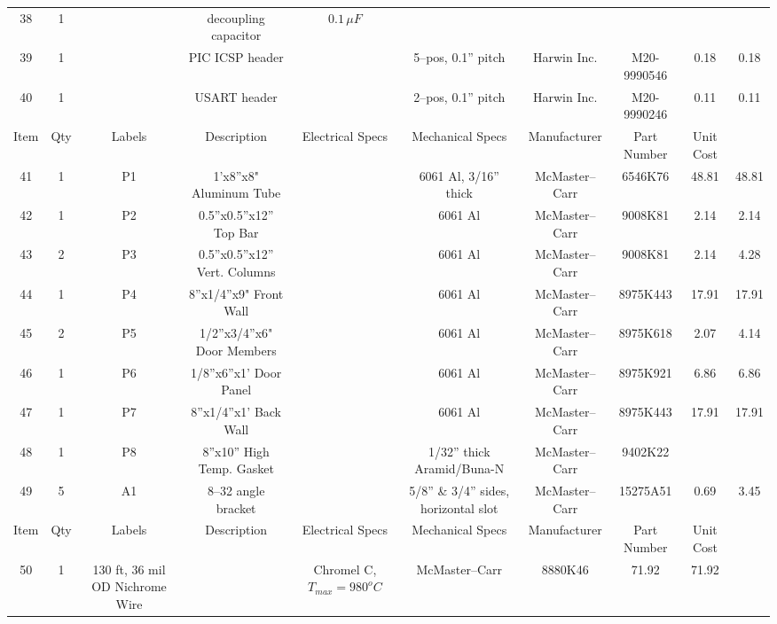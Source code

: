 \documentclass[10pt, twocolumn]{article}
\begin{document}
\begin{center}
\begin{adjustbox}{max width=\textwidth}
\begin{tabular}{c c c c c c c c c c}
38	&1	&	&decoupling capacitor		&$0.1\,\mu F$				&
	&		&				&		&	\\

39	&1	&	&PIC ICSP header		&				&5--pos, 0.1” pitch
	&Harwin Inc.	&M20-9990546			&0.18		&0.18	\\

40	&1	&	&USART header			&				&2--pos, 0.1” pitch
	&Harwin Inc.	&M20-9990246			&0.11		&0.11	\\

\hline
Item	&Qty	&Labels	&Description	&Electrical Specs	&Mechanical Specs
	&Manufacturer		&Part Number		&Unit Cost	&	\\
\hline

41	&1	&P1	&1'x8”x8" Aluminum Tube		&	&6061 Al, 3/16” thick
	&McMaster--Carr	&6546K76			&48.81		&48.81	\\

42	&1	&P2	&0.5”x0.5”x12” Top Bar		&	&6061 Al
	&McMaster--Carr	&9008K81			&2.14		&2.14	\\

43	&2	&P3	&0.5”x0.5”x12” Vert. Columns	&	&6061 Al
	&McMaster--Carr	&9008K81			&2.14		&4.28	\\

44	&1	&P4	&8”x1/4”x9" Front Wall		&	&6061 Al
	&McMaster--Carr	&8975K443			&17.91		&17.91	\\

45	&2	&P5	&1/2”x3/4”x6" Door Members	&	&6061 Al
	&McMaster--Carr	&8975K618			&2.07		&4.14	\\

46	&1	&P6	&1/8”x6”x1' Door Panel		&	&6061 Al
	&McMaster--Carr	&8975K921			&6.86		&6.86	\\

47	&1	&P7	&8”x1/4”x1' Back Wall		&	&6061 Al
	&McMaster--Carr	&8975K443			&17.91		&17.91	\\

48	&1	&P8	&8”x10” High Temp. Gasket	&	&1/32” thick Aramid/Buna-N
	&McMaster--Carr	&9402K22		&		&	\\

49	&5	&A1	&8--32 angle bracket		&	&5/8” \& 3/4” sides, horizontal slot
	&McMaster--Carr	&15275A51		&0.69	&3.45	\\

\hline
Item	&Qty	&Labels	&Description	&Electrical Specs	&Mechanical Specs
	&Manufacturer		&Part Number		&Unit Cost	&	\\
\hline

50	&1	&130 ft, 36 mil OD Nichrome Wire	&	&Chromel C, $T_{max}=980^{o}C$
	&McMaster--Carr	&8880K46		&71.92	&71.92	\\


\end{tabular}
\end{adjustbox}
\end{center}
\end{document}
